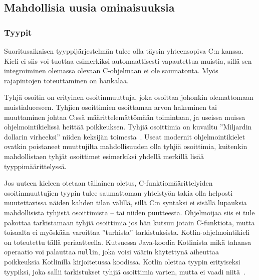\FloatBarrier

\subsection{Mahdollisia uusia ominaisuuksia}

\subsubsection{Tyypit}

Suoritusaikaisen tyyppijärjestelmän tulee olla täysin yhteensopiva C:n kanssa. Kieli
ei siis voi tuottaa esimerkiksi automaattisesti vapautettua muistia, sillä sen
integroiminen olemassa olevaan C-ohjelmaan ei ole saumatonta. Myös rajapintojen
toteuttaminen on hankalaa.

Tyhjä osoitin on erityinen osoitinmuuttuja, joka osoittaa
johonkin olemattomaan muistialueeseen. Tyhjien osoittimien osoittaman arvon
hakeminen tai muuttaminen johtaa C:ssä määrittelemättömään toimintaan, ja
useissa muissa ohjelmointikielissä heittää poikkeuksen. Tyhjiä osoittimia on
kuvailtu ''Miljardin dollarin virheeksi'' niiden keksijän
toimesta~\citep{billiondollars}. Useat modernit ohjelmointikielet ovatkin
poistaneet muuttujilta mahdollisuuden olla tyhjiä osoittimia, kuitenkin
mahdollistaen tyhjät osoittimet esimerkiksi yhdellä merkillä lisää
tyyppimäärittelyssä.

Jos uuteen kieleen otetaan tällainen oletus, C-funktiomäärittelyiden
osoitinmuuttujien tyypin tulee saumattoman yhteistyön takia olla helposti
muutettavissa näiden kahden tilan välillä, sillä C:n syntaksi ei sisällä
lupauksia mahdollisista tyhjistä osoittimista -- tai niiden puutteesta.
Ohjelmoijaa siis ei tule pakottaa tarkistamaan tyhjiä osoittimia jos hän kutsuu
jotain C-funktiota, mutta toisaalta ei myöskään varoittaa ''turhista''
tarkistuksista. Kotlin-ohjelmointikieli~\citep{kotlin} on toteutettu tällä
periaatteella. Kutsuessa Java-koodia Kotlinista mikä tahansa operaatio voi
palauttaa \texttt{null}in, joka voisi väärin käytettynä aiheuttaa poikkeuksia
Kotlinilla kirjoitetussa koodissa. Kotlin olettaa tyypin erityiseksi tyypiksi,
joka sallii tarkistukset tyhjiä osoittimia varten, mutta ei vaadi
niitä~\citep{kotlinnullability}.


